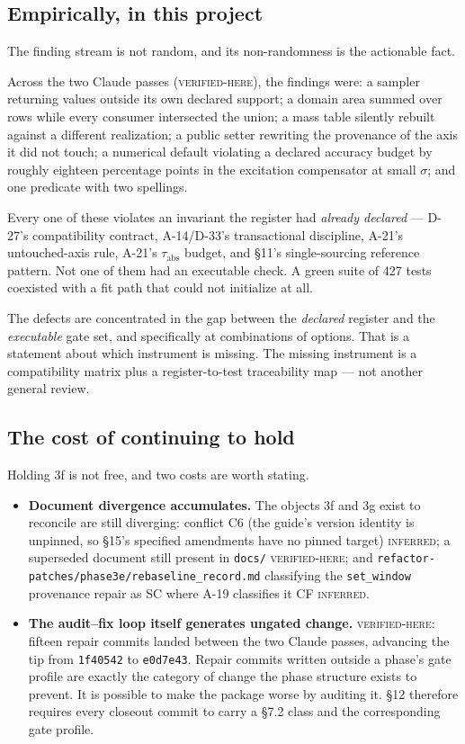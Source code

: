 \documentclass[11pt]{article}
\newcommand{\vfy}{\textsc{verified-here}}
\newcommand{\infd}{\textsc{inferred}}
\renewcommand{\tt}[1]{\texttt{#1}}
\newcommand{\tabs}{\ensuremath{\tau_{\mathrm{abs}}}}
\newenvironment{ruling}{\begin{leftbar}\small}{\end{leftbar}}
\begin{document}
\subsection*{Empirically, in this project}

The finding stream is not random, and its non-randomness is the actionable fact.

Across the two Claude passes (\vfy), the findings were: a sampler returning values outside
its own declared support; a domain area summed over rows while every consumer intersected
the union; a mass table silently rebuilt against a different realization; a public setter
rewriting the provenance of the axis it did not touch; a numerical default violating a
declared accuracy budget by roughly eighteen percentage points in the excitation
compensator at small $\sigma$; and one predicate with two spellings.

Every one of these violates an invariant the register had \emph{already declared} ---
D-27's compatibility contract, A-14/D-33's transactional discipline, A-21's
untouched-axis rule, A-21's \tabs{} budget, and \S11's single-sourcing reference pattern.
Not one of them had an executable check. A green suite of 427 tests coexisted with a fit
path that could not initialize at all.

\begin{ruling}
\noindent The defects are concentrated in the gap between the \emph{declared} register and
the \emph{executable} gate set, and specifically at combinations of options. That is a
statement about which instrument is missing. The missing instrument is a compatibility
matrix plus a register-to-test traceability map --- not another general review.
\end{ruling}

\subsection*{The cost of continuing to hold}

Holding 3f is not free, and two costs are worth stating.

\begin{itemize}
  \item \textbf{Document divergence accumulates.} The objects 3f and 3g exist to
  reconcile are still diverging: conflict C6 (the guide's version identity is unpinned,
  so \S15's specified amendments have no pinned target) \infd; a superseded document
  still present in \tt{docs/} \vfy; and \tt{refactor-patches/\allowbreak{}phase3e/\allowbreak{}rebaseline\_record.md}
  classifying the \tt{set\_window} provenance repair as SC where A-19 classifies it CF
  \infd.
  \item \textbf{The audit--fix loop itself generates ungated change.} \vfy: fifteen repair
  commits landed between the two Claude passes, advancing the tip from \tt{1f40542} to
  \tt{e0d7e43}. Repair commits written outside a phase's gate profile are exactly the
  category of change the phase structure exists to prevent. It is possible to make the
  package worse by auditing it. \S12 therefore requires every closeout commit to carry a
  \S7.2 class and the corresponding gate profile.
\end{itemize}
\end{document}
